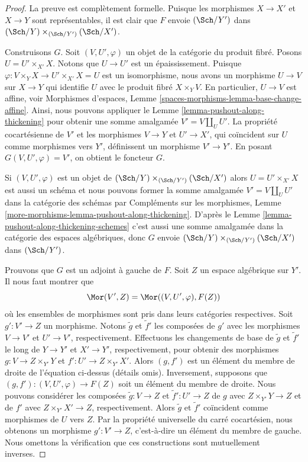 \begin{proof} La preuve est complètement formelle. Puisque les morphismes $X \to X'$ et $X \to Y$ sont représentables, il est clair que $F$ envoie $(\Sch/Y')$ dans $(\Sch/Y) \times_{(\Sch/Y')} (\Sch/X')$.

\medskip\noindent
Construisons $G$. Soit $(V, U', \varphi)$ un objet de la catégorie du produit fibré. Posons $U = U' \times_{X'} X$. Notons que $U \to U'$ est un épaississement. Puisque $\varphi : V \times_Y X \to U' \times_{X'} X = U$ est un isomorphisme, nous avons un morphisme $U \to V$ sur $X \to Y$ qui identifie $U$ avec le produit fibré $X \times_Y V$. En particulier, $U \to V$ est affine, voir Morphismes d'espaces, Lemme \ref{spaces-morphisms-lemma-base-change-affine}. 
Ainsi, nous pouvons appliquer le Lemme \ref{lemma-pushout-along-thickening} pour obtenir une somme amalgamée $V' = V \amalg_U U'$. La propriété cocartésienne de $V'$ et les morphismes $V \to Y$ et $U' \to X'$, qui coïncident sur $U$ comme morphismes vers $Y'$, définissent un morphisme $V' \to Y'$. En posant $G(V, U', \varphi) = V'$, on obtient le foncteur $G$.

\medskip\noindent
Si $(V, U', \varphi)$ est un objet de $(\Sch/Y) \times_{(\Sch/Y')} (\Sch/X')$
alors $U = U' \times_{X'} X$ est aussi un schéma et nous pouvons former la somme amalgamée
$V' = V \amalg_U U'$ dans la catégorie des schémas par
Compléments sur les morphismes, Lemme \ref{more-morphisms-lemma-pushout-along-thickening}.
D'après le Lemme \ref{lemma-pushout-along-thickening-schemes}
c'est aussi une somme amalgamée dans la catégorie des espaces algébriques, donc
$G$ envoie $(\Sch/Y) \times_{(\Sch/Y')} (\Sch/X')$ dans $(\Sch/Y')$.

\medskip\noindent
Prouvons que $G$ est un adjoint à gauche de $F$. Soit $Z$ un espace algébrique sur $Y'$. Il nous faut montrer que
$$
\Mor(V', Z) = \Mor((V, U', \varphi), F(Z))
$$
où les ensembles de morphismes sont pris dans leurs catégories respectives.
Soit $g' : V' \to Z$ un morphisme. Notons $\tilde g$ et $\tilde f'$ les composées de $g'$ avec les morphismes $V \to V'$ et $U' \to V'$, respectivement.
Effectuons les changements de base de $\tilde g$ et $\tilde f'$ le long de $Y \to Y'$ et $X' \to Y'$, respectivement, pour obtenir des morphismes $g : V \to Z \times_{Y'} Y$ et $f' : U' \to Z \times_{Y'} X'$. Alors $(g, f')$ est un élément du membre de droite de l'équation ci-dessus (détails omis).
Inversement, supposons que $(g, f') : (V, U', \varphi) \to F(Z)$ soit un élément du membre de droite. Nous pouvons considérer les composées $\tilde g : V \to Z$ et $\tilde f' : U' \to Z$ de $g$ avec $Z \times_{Y'} Y \to Z$ et de $f'$ avec $Z \times_{Y'} X' \to Z$, respectivement. Alors $\tilde g$ et $\tilde f'$ coïncident comme morphismes de $U$ vers $Z$. Par la propriété universelle du carré cocartésien, nous obtenons un morphisme $g' : V' \to Z$, c'est-à-dire un élément du membre de gauche. Nous omettons la vérification que ces constructions sont mutuellement inverses. 
\end{proof}

